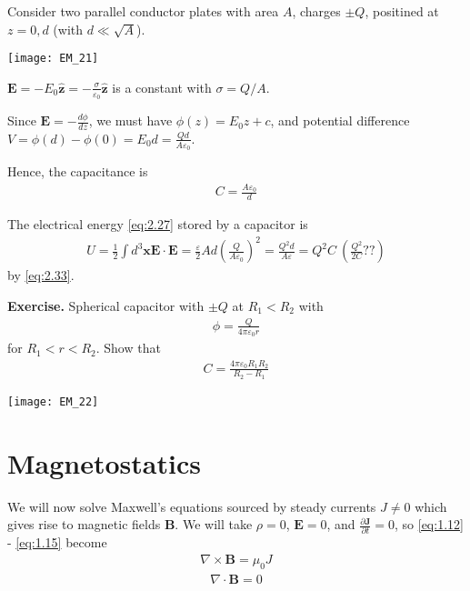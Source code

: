 \documentclass[a4paper]{article}
\begin{document}
Consider two parallel conductor plates with area $A$, charges $\pm Q$, positined at $z=0,d$ (with $d \ll \sqrt{A}$).

\texttt{[image: EM\_21]}

$\mathbf{E} = -E_0 \hat{\mathbf{z}} = -\frac{\sigma}{\varepsilon_0} \hat{\mathbf{z}}$ is a constant with $\sigma = Q/A$.

Since $\mathbf{E} = -\frac{d\phi}{dz}$, we must have $\phi(z) = E_0 z + c$, and potential difference $V = \phi(d) - \phi(0) = E_0 d = \frac{Qd}{A\varepsilon_0}$.

Hence, the capacitance is
\begin{equation*}\tag{2.33} \label{eq:2.33}
\begin{aligned}
C=\frac{A\varepsilon_0}{d}
\end{aligned}
\end{equation*}

The electrical energy \eqref{eq:2.27} stored by a capacitor is
\begin{equation*}
\begin{aligned}
U=\frac{1}{2} \int d^3 \mathbf{x} \mathbf{E} \cdot \mathbf{E} = \frac{\varepsilon}{2} Ad \left(\frac{Q}{A\varepsilon_0}\right)^2 = \frac{Q^2d}{A\varepsilon} = Q^2 C  \  (\frac{Q^2}{2C}??)
\end{aligned}
\end{equation*}
by \eqref{eq:2.33}.

\textbf{Exercise.} Spherical capacitor with $\pm Q$ at $R_1 < R_2$ with
\begin{equation*}
\begin{aligned}
\phi = \frac{Q}{4\pi\varepsilon_0 r}
\end{aligned}
\end{equation*}
for $R_1<r<R_2$. Show that
\begin{equation*}
\begin{aligned}
C = \frac{4\pi\varepsilon_0 R_1 R_2}{R_2-R_1}
\end{aligned}
\end{equation*}

\texttt{[image: EM\_22]}

\newpage

\section{Magnetostatics}
We will now solve Maxwell's equations sourced by steady currents $J \neq 0$ which gives rise to magnetic fields $\mathbf{B}$. We will take $\rho = 0$, $\mathbf{E} = 0$, and $\frac{\partial \mathbf{J}}{\partial t} = 0$, so \eqref{eq:1.12} - \eqref{eq:1.15} become
\begin{equation*}\tag{3.1} \label{eq:3.1}
\begin{aligned}
\nabla \times \mathbf{B} = \mu_0 J
\end{aligned}
\end{equation*}
\begin{equation*}\tag{3.2} \label{eq:3.2}
\begin{aligned}
\nabla \cdot \mathbf{B} = 0
\end{aligned}
\end{equation*}
\end{document}
